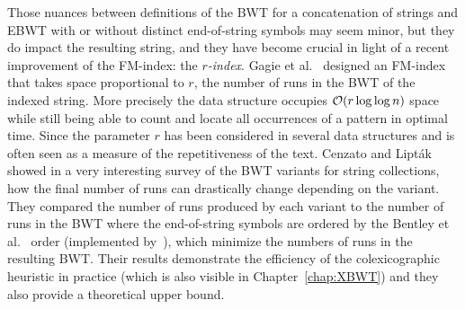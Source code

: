 Those nuances between definitions of the BWT for a concatenation of strings and EBWT with or without distinct end-of-string symbols may seem minor, but they do impact the resulting string, and they have become crucial in light of a recent improvement of the FM-index: the \emph{$r$-index}.
Gagie et al.~\cite{gagie2020fully} designed an FM-index that takes space proportional to $r$, the number of runs in the BWT of the indexed string. More precisely the data structure occupies $\mathcal{O}(r\log\log n)$ space while still being able to count and locate all occurrences of a pattern in optimal time.
Since the parameter $r$ has been considered in several data structures and is often seen as a measure of the repetitiveness of the text.
Cenzato and Lipták~\cite{cenzato_et_al_BWT_Collections} showed in a very interesting survey of the BWT variants for string collections, how the final  number of runs can drastically change depending on the variant. 
They compared the number of runs produced by each variant to the number of runs in the BWT where the end-of-string symbols are ordered by the Bentley et al.~\cite{bentley2019complexity} order (implemented by~\cite{cenzato2023computing}), which minimize the numbers of runs in the resulting BWT.
Their results demonstrate the efficiency of the colexicographic heuristic in practice (which is also visible in Chapter~\ref{chap:XBWT}) and they also provide a theoretical upper bound.

